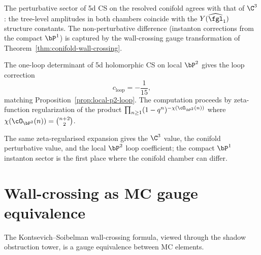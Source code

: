 \begin{proposition}
\label{prop:conifold-perturbative}
The perturbative sector of 5d CS on the resolved conifold agrees with that of $\C^3$: the tree-level amplitudes in both chambers coincide with the $Y(\widehat{\fgl}_1)$ structure constants. The non-perturbative difference (instanton corrections from the compact $\bP^1$) is captured by the wall-crossing gauge transformation of Theorem~\ref{thm:conifold-wall-crossing}.
\end{proposition}

\begin{proposition}
\label{prop:5d-cs-local-p2}
The one-loop determinant of 5d holomorphic CS on local $\bP^2$ gives the loop correction
\[
 c_{\mathrm{loop}} = -\frac{1}{15},
\]
matching Proposition~\ref{prop:local-p2-loop}. The computation proceeds by zeta-function regularization of the product $\prod_{n \geq 1}(1 - q^n)^{-\chi(\cO_{\bP^2}(n))}$ where $\chi(\cO_{\bP^2}(n)) = \binom{n+2}{2}$.
\end{proposition}

The same zeta-regularised expansion gives the $\C^3$ value, the conifold
perturbative value, and the local $\bP^2$ loop coefficient; the compact
$\bP^1$ instanton sector is the first place where the conifold chamber
can differ.

\section{Wall-crossing as MC gauge equivalence}
\label{sec:wall-crossing-mc}

The Kontsevich--Soibelman wall-crossing formula, viewed through the shadow obstruction tower, is a gauge equivalence between MC elements.

